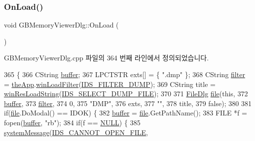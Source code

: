\subsubsection{\texorpdfstring{On\+Load()}{OnLoad()}}
{\footnotesize\ttfamily void G\+B\+Memory\+Viewer\+Dlg\+::\+On\+Load (\begin{DoxyParamCaption}{ }\end{DoxyParamCaption})\hspace{0.3cm}{\ttfamily [protected]}}



G\+B\+Memory\+Viewer\+Dlg.\+cpp 파일의 364 번째 라인에서 정의되었습니다.


\begin{DoxyCode}
365 \{
366   CString \mbox{\hyperlink{_g_b_a_8cpp_a28d4d3d8445e73a696b2d6f7eadabd96}{buffer}};
367   LPCTSTR exts[] = \{ \textcolor{stringliteral}{".dmp"} \};
368   CString \mbox{\hyperlink{_s_d_l_8cpp_af0122ee4312107103b580a98c74a4ea6}{filter}} = \mbox{\hyperlink{_v_b_a_8cpp_a8095a9d06b37a7efe3723f3218ad8fb3}{theApp}}.\mbox{\hyperlink{class_v_b_a_a228edf26b0dc4129658c174ee5a3c27c}{winLoadFilter}}(\mbox{\hyperlink{resource_8h_aaf1a4e4f021c1d724b128a7e1434e3b0}{IDS\_FILTER\_DUMP}});
369   CString title = \mbox{\hyperlink{_win_res_util_8cpp_a416e85e80ab9b01376e87251c83d1a5a}{winResLoadString}}(\mbox{\hyperlink{resource_8h_a3f960ace1d09f5827e8739b1e7ea2002}{IDS\_SELECT\_DUMP\_FILE}});
370   
371   \mbox{\hyperlink{class_file_dlg}{FileDlg}} \mbox{\hyperlink{expr-lex_8cpp_a702945180aa732857b380a007a7e2a21}{file}}(\textcolor{keyword}{this},
372                \mbox{\hyperlink{_g_b_a_8cpp_a28d4d3d8445e73a696b2d6f7eadabd96}{buffer}},
373                \mbox{\hyperlink{_s_d_l_8cpp_af0122ee4312107103b580a98c74a4ea6}{filter}}, 
374                0,
375                \textcolor{stringliteral}{"DMP"},
376                exts,
377                \textcolor{stringliteral}{""},
378                title, 
379                \textcolor{keyword}{false});
380   
381   \textcolor{keywordflow}{if}(\mbox{\hyperlink{expr-lex_8cpp_a702945180aa732857b380a007a7e2a21}{file}}.DoModal() == IDOK) \{
382     \mbox{\hyperlink{_g_b_a_8cpp_a28d4d3d8445e73a696b2d6f7eadabd96}{buffer}} = \mbox{\hyperlink{expr-lex_8cpp_a702945180aa732857b380a007a7e2a21}{file}}.GetPathName();
383     FILE *f = fopen(\mbox{\hyperlink{_g_b_a_8cpp_a28d4d3d8445e73a696b2d6f7eadabd96}{buffer}}, \textcolor{stringliteral}{"rb"});
384     \textcolor{keywordflow}{if}(f == \mbox{\hyperlink{getopt1_8c_a070d2ce7b6bb7e5c05602aa8c308d0c4}{NULL}}) \{
385       \mbox{\hyperlink{system_8cpp_a747a9cb8e015a3d45cca636b5bd0fc69}{systemMessage}}(\mbox{\hyperlink{resource_8h_a6fbf5fa70687bb1b3cc82c050b88bca8}{IDS\_CANNOT\_OPEN\_FILE}},

\end{DoxyCode}
